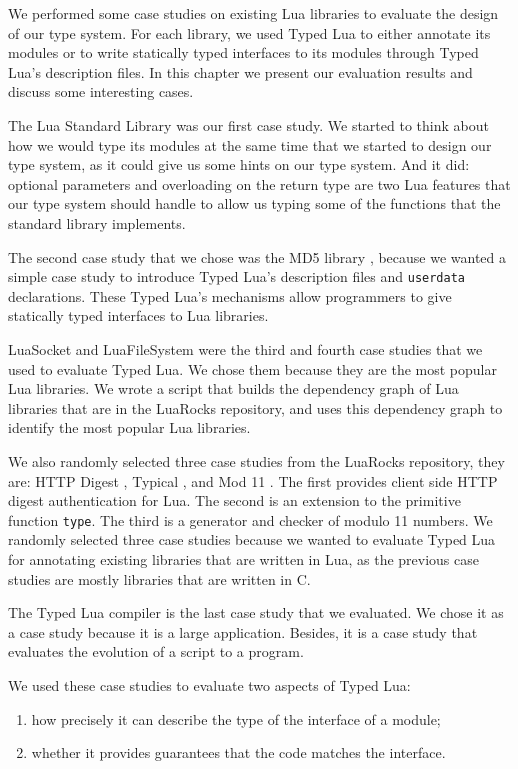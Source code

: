
We performed some case studies on existing Lua libraries
to evaluate the design of our type system.
For each library, we used Typed Lua to either annotate its modules
or to write statically typed interfaces to its modules through
Typed Lua's description files.
In this chapter we present our evaluation results and discuss some
interesting cases.

The Lua Standard Library \cite{luamanual} was our first case study.
We started to think about how we would type its modules at the same time
that we started to design our type system, as it could give us some
hints on our type system.
And it did: optional parameters and overloading on the return type
are two Lua features that our type system should handle to allow us
typing some of the functions that the standard library implements.

The second case study that we chose was the MD5 library \cite{lmd5},
because we wanted a simple case study to introduce Typed Lua's description
files and \texttt{userdata} declarations.
These Typed Lua's mechanisms allow programmers to give statically typed
interfaces to Lua libraries.

LuaSocket \cite{luasocket} and LuaFileSystem \cite{luafilesystem} were
the third and fourth case studies that we used to evaluate Typed Lua.
We chose them because they are the most popular Lua libraries.
We wrote a script that builds the dependency graph of Lua libraries
that are in the LuaRocks repository, and uses this dependency graph
to identify the most popular Lua libraries.

We also randomly selected three case studies from the LuaRocks
repository, they are: HTTP Digest \cite{luahttpdigest},
Typical \cite{luatypical}, and Mod 11 \cite{luamod11}.
The first provides client side HTTP digest authentication for Lua.
The second is an extension to the primitive function \texttt{type}.
The third is a generator and checker of modulo 11 numbers.
We randomly selected three case studies because we wanted to evaluate
Typed Lua for annotating existing libraries that are written in Lua,
as the previous case studies are mostly libraries that are written in C.

The Typed Lua compiler is the last case study that we evaluated.
We chose it as a case study because it is a large application.
Besides, it is a case study that evaluates the evolution of a script
to a program.

We used these case studies to evaluate two aspects of Typed Lua:
\begin{enumerate}
\item how precisely it can describe the type of the interface of a module;
\item whether it provides guarantees that the code matches the interface.
\end{enumerate}

